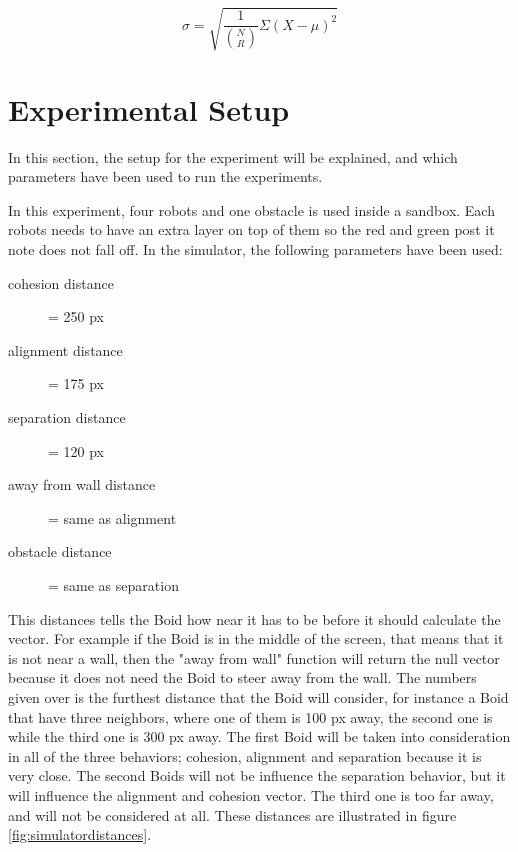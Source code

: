 \begin{equation}
\label{eq:sd2}
\sigma =  \sqrt{\frac{1}{{N \choose R}}\Sigma(X-\mu)^2}
\end{equation}


\section{Experimental Setup}
\label{sec:experimentalSetup}
In this section, the setup for the experiment will be explained, and which parameters have been used to run the experiments.

In this experiment, four robots and one obstacle is used inside a sandbox. Each robots needs to have an extra layer on top of them so the red and green post it note does not fall off.
In the simulator, the following parameters have been used:
\begin{description}
\item[cohesion distance] = 250 px
\item[alignment distance] = 175 px
\item[separation distance] = 120 px
\item[away from wall distance] = same as alignment
\item[obstacle distance] = same as separation
\end{description}
This distances tells the Boid how near it has to be before it should calculate the vector. For example if the Boid is in the middle of the screen, that means that it is not near a wall, then the "away from wall" function will return the null vector because it does not need the Boid to steer away from the wall.
The numbers given over is the furthest distance that the Boid will consider, for instance a Boid that have three neighbors, where one of them is 100 px away, the second one is  while the third one is 300 px away. The first Boid will be taken into consideration in all of the three behaviors; cohesion, alignment and separation because it is very close. The second Boids will not be influence the separation behavior, but it will influence the alignment and cohesion vector. The third one is too far away, and will not be considered at all. These distances are illustrated in figure \ref{fig:simulatordistances}.

